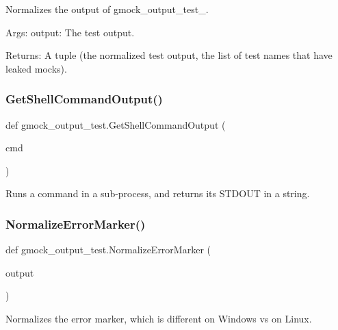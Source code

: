 \begin{DoxyVerb}Normalizes the output of gmock_output_test_.

Args:
  output: The test output.

Returns:
  A tuple (the normalized test output, the list of test names that have
  leaked mocks).
\end{DoxyVerb}
 \mbox{\label{namespacegmock__output__test_a001498a3e9bf552ee429e434eb00cb08}} 
\subsubsection{\texorpdfstring{GetShellCommandOutput()}{GetShellCommandOutput()}}
{\footnotesize\ttfamily def gmock\+\_\+output\+\_\+test.\+Get\+Shell\+Command\+Output (\begin{DoxyParamCaption}\item[{}]{cmd }\end{DoxyParamCaption})}

\begin{DoxyVerb}Runs a command in a sub-process, and returns its STDOUT in a string.\end{DoxyVerb}
 \mbox{\label{namespacegmock__output__test_af3c1f95f19b9f048843a2d562d459b24}} 
\subsubsection{\texorpdfstring{NormalizeErrorMarker()}{NormalizeErrorMarker()}}
{\footnotesize\ttfamily def gmock\+\_\+output\+\_\+test.\+Normalize\+Error\+Marker (\begin{DoxyParamCaption}\item[{}]{output }\end{DoxyParamCaption})}

\begin{DoxyVerb}Normalizes the error marker, which is different on Windows vs on Linux.\end{DoxyVerb}
 \mbox{\label{namespacegmock__output__test_aa3c93f8085ff0886bf0d160d71af2452}} 
